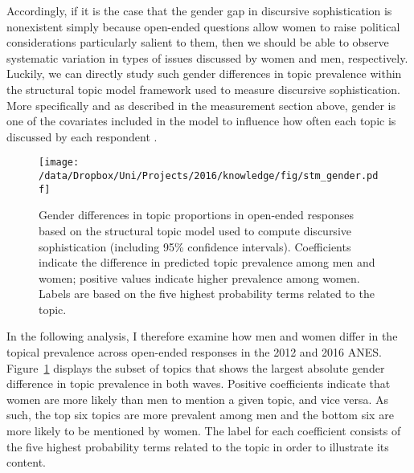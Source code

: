 Accordingly, if it is the case that the gender gap in discursive sophistication is nonexistent simply because open-ended questions allow women to raise political considerations particularly salient to them, then we should be able to observe systematic variation in types of issues discussed by women and men, respectively. Luckily, we can directly study such gender differences in topic prevalence within the structural topic model framework used to measure discursive sophistication. More specifically and as described in the measurement section above, gender is one of the covariates included in the model to influence how often each topic is discussed by each respondent \citep[see also][for details]{roberts2014structural}.

\begin{figure}[h]\centering
\texttt{[image: /data/Dropbox/Uni/Projects/2016/knowledge/fig/stm\_gender.pdf]}
\caption[Gender differences in topic proprtions in open-ended responses]{Gender differences in topic proportions in open-ended responses based on the structural topic model used to compute discursive sophistication (including 95\% confidence intervals). Coefficients indicate the difference in predicted topic prevalence among men and women; positive values indicate higher prevalence among women. Labels are based on the five highest probability terms related to the topic.
}\label{fig:stm_gender}
\end{figure}

In the following analysis, I therefore examine how men and women differ in the topical prevalence across open-ended responses in the 2012 and 2016 ANES. Figure~\ref{fig:stm_gender} displays the subset of topics that shows the largest absolute gender difference in topic prevalence in both waves. Positive coefficients indicate that women are more likely than men to mention a given topic, and vice versa. As such, the top six topics are more prevalent among men and the bottom six are more likely to be mentioned by women. The label for each coefficient consists of the five highest probability terms related to the topic in order to illustrate its content.

